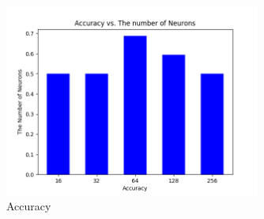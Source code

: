 \documentclass[draft,dvipsnames]{drexel-thesis}
\begin{document}
\begin{thesis}
\begin{figure}[H]
    \centering
    \includegraphics[width=0.75\textwidth]{pictures/accuracy.png}
    \caption{Accuracy}
    \label{fig:Accuracy}
\end{figure}



\end{thesis}
\end{document}
